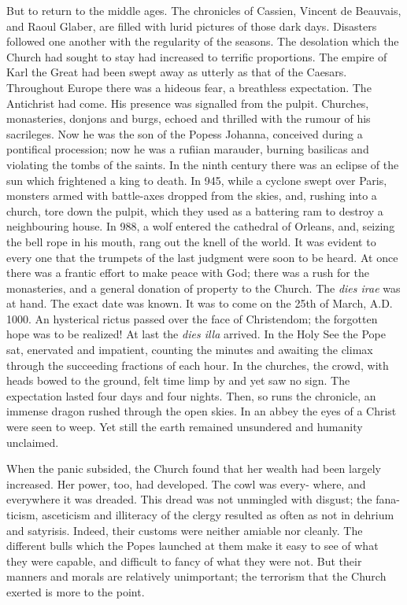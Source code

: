 \documentclass[]{book}
\begin{document}
But to return to the middle ages. The chronicles of Cassien, Vincent de
Beauvais, and Raoul Glaber, are filled with lurid pictures of those dark
days. Disasters followed one another with the regularity of the seasons.
The desolation which the Church had sought to stay had increased to
terrific proportions. The empire of Karl the Great had been swept away
as utterly as that of the Caesars. Throughout Europe there was a hideous
fear, a breathless expectation. The Antichrist had come. His presence
was signalled from the pulpit. Churches, monasteries, donjons and burgs,
echoed and thrilled with the rumour of his sacrileges. Now he was the
son of the Popess Johanna, conceived during a pontifical procession; now
he was a rufiian marauder, burning basilicas and violating the tombs of
the saints. In the ninth century there was an eclipse of the sun which
frightened a king to death. In 945, while a cyclone swept over Paris,
monsters armed with battle-axes dropped from the skies, and, rushing
into a church, tore down the pulpit, which they used as a battering ram
to destroy a neighbouring house. In 988, a wolf entered the cathedral of
Orleans, and, seizing the bell rope in his mouth, rang out the knell of
the world. It was evident to every one that the trumpets of the last
judgment were soon to be heard. At once there was a frantic effort to
make peace with God; there was a rush for the monasteries, and a general
donation of property to the Church. The \emph{dies irae} was at hand.
The exact date was known. It was to come on the 25th of March, A.D.
1000. An hysterical rictus passed over the face of Christendom; the
forgotten hope was to be realized! At last the \emph{dies illa} arrived.
In the Holy See the Pope sat, enervated and impatient, counting the
minutes and awaiting the climax through the succeeding fractions of each
hour. In the churches, the crowd, with heads bowed to the ground, felt
time limp by and yet saw no sign. The expectation lasted four days and
four nights. Then, so runs the chronicle, an immense dragon rushed
through the open skies. In an abbey the eyes of a Christ were seen to
weep. Yet still the earth remained unsundered and humanity unclaimed.

When the panic subsided, the Church found that her wealth had been
largely increased. Her power, too, had developed. The cowl was every-
where, and everywhere it was dreaded. This dread was not unmingled with
disgust; the fana- ticism, asceticism and illiteracy of the clergy
resulted as often as not in dehrium and satyrisis. Indeed, their customs
were neither amiable nor cleanly. The different bulls which the Popes
launched at them make it easy to see of what they were capable, and
difficult to fancy of what they were not. But their manners and morals
are relatively unimportant; the terrorism that the Church exerted is
more to the point.
\end{document}
